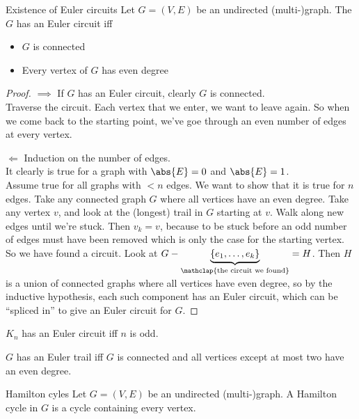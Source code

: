 \documentclass[english]{lbscript}
\begin{document}
\begin{theorem}{Existence of Euler circuits}{}
  Let \(G=(V,E)\) be an undirected (multi-)graph. \tcblower
  The \(G\) has an Euler circuit iff
  \begin{itemize}
    \item \(G\) is connected
    \item Every vertex of \(G\) has even degree
  \end{itemize}
\end{theorem}
\begin{proof}
  \(⟹\) If \(G\) has an Euler circuit, clearly \(G\) is connected.\\
  Traverse the circuit. Each vertex that we enter, we want to leave again. So when we come back to the starting point, we've goe through an even number of edges at every vertex.

  \(\Longleftarrow\) Induction on the number of edges.\\
  It clearly is true for a graph with \(\abs{E}=0\) and \(\abs{E}=1\).\\
  Assume true for all graphs with \(<n\) edges. We want to show that it is true for \(n\) edges. Take any connected graph \(G\) where all vertices have an even degree. Take any vertex \(v\), and look at the (longest) trail in \(G\) starting at \(v\). Walk along new edges until we're stuck. Then \(v_k=v\), because to be stuck before an odd number of edges must have been removed which is only the case for the starting vertex. So we have found a circuit. Look at \(G-\underbrace{\left\{ e_1, \dots, e_k \right\}}_{\mathclap{\text{the circuit we found}}} = H\). Then \(H\) is a union of connected graphs where all vertices have even degree, so by the inductive hypothesis, each such component has an Euler circuit, which can be \enquote{spliced in} to give an Euler circuit for \(G\).
\end{proof}

\begin{corollary}{}{}
  \(K_n\) has an Euler circuit iff \(n\) is odd.
\end{corollary}

\begin{corollary}{}{}
  \(G\) has an Euler trail iff \(G\) is connected and all vertices except at most two have an even degree.
\end{corollary}

\begin{definition}{Hamilton cyles}{}
  Let \(G=(V,E)\) be an undirected (multi-)graph. A Hamilton cycle in \(G\) is a cycle containing every vertex.
\end{definition}
\end{document}
